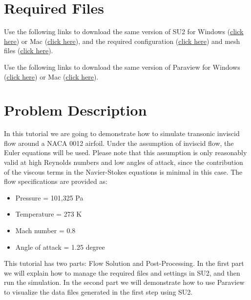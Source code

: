 \section{Required Files}
\begin{su2note}
	Use the following links to download the same version of SU2 for Windows (\href{https://users.encs.concordia.ca/~bvermeir/book/executables/windows/SU2-v7.0.0-win64.zip}{\underline{click here}}) or Mac (\href{https://users.encs.concordia.ca/~bvermeir/book/executables/osx/SU2-v7.0.0-macos64.zip}{\underline{click here}}), and the required configuration (\href{https://gitlab.com/bvermeir/book-cfd/blob/master/tutorial/tut1_inviscid_NACA 0012/inv_NACA 0012.cfg}{\underline{click here}}) and mesh files (\href{https://gitlab.com/bvermeir/book-cfd/blob/master/tutorial/tut1_inviscid_NACA 0012/mesh_NACA 0012_inv.su2}{\underline{click here}}).
\end{su2note}
\begin{paraviewnote}
	Use the following links to download the same version of Paraview for Windows (\href{https://users.encs.concordia.ca/~bvermeir/book/executables/windows/ParaView-5.4.0-Qt5-OpenGL2-Windows-64bit.exe}{\underline{click here}}) or Mac (\href{https://users.encs.concordia.ca/~bvermeir/book/executables/osx/ParaView-5.4.0-Qt5-OpenGL2-MPI-OSX10.8-64bit.dmg}{\underline{click here}}).
\end{paraviewnote}

\section{Problem Description}
In this tutorial we are going to demonstrate how to simulate transonic inviscid flow around a NACA 0012 airfoil. Under the assumption of inviscid flow, the Euler equations will be used. Please note that this assumption is only reasonably valid at high Reynolds numbers and low angles of attack, since the contribution of the viscous terms in the Navier-Stokes equations is minimal in this case. The flow specifications are provided as:
\begin{itemize}
    \item Pressure = 101,325 Pa
    \item Temperature = 273 K
    \item Mach number = 0.8
    \item Angle of attack = 1.25 degree
\end{itemize}
This tutorial has two parts: Flow Solution and Post-Processing. In the first part we will explain how to manage the required files and settings in SU2, and then run the simulation. In the second part we will demonstrate how to use Paraview to visualize the data files generated in the first step using SU2.
